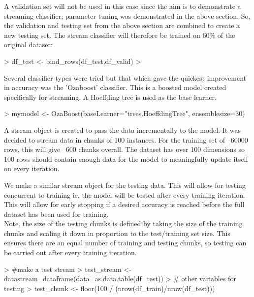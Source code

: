 \documentclass[10pt]{article}
\begin{document}
A validation set will not be used in this case since the aim is to demonstrate a streaming classifier; parameter tuning was demonstrated in the above section. So, the validation and testing set from the above section are combined to create a new testing set. The stream classifier will therefore be trained on 60\% of the original dataset:
\begin{Schunk}
\begin{Sinput}
> df_test <- bind_rows(df_test,df_valid)
> 
\end{Sinput}
\end{Schunk}
Several classifier types were tried but that which gave the quickest improvement in accuracy was the 'Ozaboost' classifier. This is a boosted model created specifically for streaming. A Hoeffding tree is used as the base learner.
\begin{Schunk}
\begin{Sinput}
> mymodel <- OzaBoost(baseLearner="trees.HoeffdingTree", ensemblesize=30)
\end{Sinput}
\end{Schunk}
A stream object is created to pass the data incrementally to the model. It was decided to stream data in chunks of 100 instances. For the training set of ~60000 rows, this will give ~600 chunks overall. The dataset has over 100 dimensions so 100 rows should contain enough data for the model to meaningfully update itself on every iteration.
\begin{Schunk}
\end{Schunk}
We make a similar stream object for the testing data. This will allow for testing concurrent to training ie, the model will be tested after every training iteration. This will allow for early stopping if a desired accuracy is reached before the full dataset has been used for training.\\
Note, the size of the testing chunks is defined by taking the size of the training chunks and scaling it down in proportion to the test/training set size. This ensures there are an equal number of training and testing chunks, so testing can be carried out after every training iteration.
\begin{Schunk}
\begin{Sinput}
> #make a test stream
> test_stream <- datastream_dataframe(data=as.data.table(df_test))
> # other variables for testing
> test_chunk <- floor(100 / (nrow(df_train)/nrow(df_test)))
\end{Sinput}
\end{Schunk}
\end{document}
